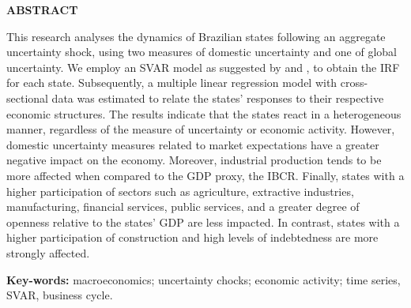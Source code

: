 \begin{center}
    \textbf{\uppercase{Abstract}}
\end{center}
\vspace*{1.5cm}


This research analyses the dynamics of Brazilian states following an aggregate uncertainty shock, using two measures of domestic uncertainty and one of global uncertainty. We employ an SVAR model as suggested by  and , to obtain the IRF for each state. Subsequently, a multiple linear regression model with cross-sectional data was estimated to relate the states' responses to their respective economic structures. The results indicate that the states react in a heterogeneous manner, regardless of the measure of uncertainty or economic activity. However, domestic uncertainty measures related to market expectations have a greater negative impact on the economy. Moreover, industrial production tends to be more affected when compared to the GDP proxy, the \gls{IBCR}. Finally, states with a higher participation of sectors such as agriculture, extractive industries, manufacturing, financial services, public services, and a greater degree of openness relative to the states' GDP are less impacted. In contrast, states with a higher participation of construction and high levels of indebtedness are more strongly affected.

\vspace*{1.5cm}
\noindent \textbf{Key-words:}  macroeconomics; uncertainty chocks; economic activity; time series, SVAR, business cycle.

\thispagestyle{empty}